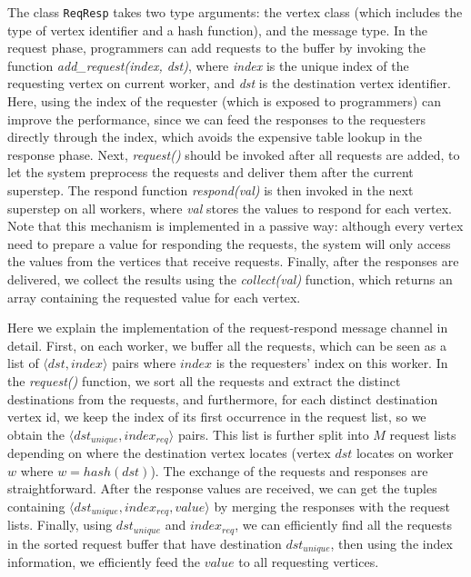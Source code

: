 \documentclass{sokendai_thesis} %
\begin{document}
The class \texttt{ReqResp} takes two type arguments: the vertex class (which includes the type of vertex identifier and a hash function), and the message type.
In the request phase, programmers can add requests to the buffer by invoking the function \emph{add\_request(index, dst)}, where \emph{index} is the unique index of the requesting vertex on current worker, and \emph{dst} is the destination vertex identifier.
Here, using the index of the requester (which is exposed to programmers) can improve the performance, since we can feed the responses to the requesters directly through the index, which avoids the expensive table lookup in the response phase.
Next, \emph{request()} should be invoked after all requests are added, to let the system preprocess the requests and deliver them after the current superstep.
The respond function \emph{respond(val)} is then invoked in the next superstep on all workers, where \emph{val} stores the values to respond for each vertex.
Note that this mechanism is implemented in a passive way: although every vertex need to prepare a value for responding the requests, the system will only access the values from the vertices that receive requests.
Finally, after the responses are delivered, we collect the results using the \emph{collect(val)} function, which returns an array containing the requested value for each vertex.

Here we explain the implementation of the request-respond message channel in detail.
First, on each worker, we buffer all the requests, which can be seen as a list of $\langle dst,index\rangle$ pairs where $index$ is the requesters' index on this worker.
In the \emph{request()} function, we sort all the requests and extract the distinct destinations from the requests, and furthermore, for each distinct destination vertex id, we keep the index of its first occurrence in the request list, so we obtain the $\langle dst_{unique},index_{req}\rangle$ pairs.
This list is further split into $M$ request lists depending on where the destination vertex locates (vertex $dst$ locates on worker $w$ where $w=hash(dst)$).
The exchange of the requests and responses are straightforward.
After the response values are received, we can get the tuples containing $\langle dst_{unique},index_{req},value\rangle$ by merging the responses with the request lists.
Finally, using $dst_{unique}$ and $index_{req}$, we can efficiently find all the requests in the sorted request buffer that have destination $dst_{unique}$, then using the index information, we efficiently feed the $value$ to all requesting vertices.
\end{document}
